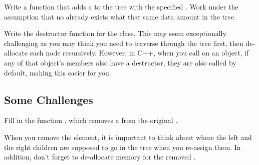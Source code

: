 \documentclass{tufte-handout}
\begin{document}
Write a function  that adds a  to the tree with the specified .
Work under the assumption that no  already exists what that same data amount in the tree.

Write the destructor function for the  class.
This may seem exceptionally challenging as you may think you need to traverse through the tree first, then de-allocate each node recursively.
However, in C++, when you call  on an object, if any of that object's members also have a destructor, they are also called by default, making this easier for you.

\subsection{Some Challenges}

Fill in the function , which removes a  from the original .

When you remove the element, it is important to think about where the left and the right children are supposed to go in the tree when you re-assign them.
In addition, don't forget to de-allocate memory for the removed .
\end{document}
